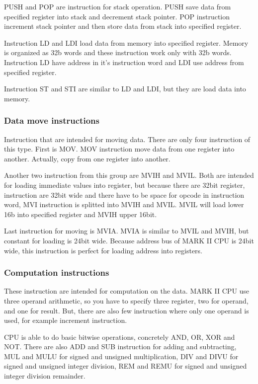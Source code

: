 PUSH and POP are instruction for stack operation. PUSH save data from specified
register into stack and decrement stack pointer. POP instruction increment
stack pointer and then store data from stack into specified register.

Instruction LD and LDI load data from memory into specified register. Memory is
organized as 32b words and these instruction work only with 32b words.
Instruction LD have address in it's instruction word and LDI use address from
specified register.

Instruction ST and STI are similar to LD and LDI, but they are load data into
memory.

\subsubsection{Data move instructions}

Instruction that are intended for moving data. There are only four instruction
of this type. First is MOV. MOV instruction move data from one register into
another. Actually, copy from one register into another.

Another two instruction from this group are MVIH and MVIL. Both are intended
for loading immediate values into register, but because there are 32bit
register, instruction are 32bit wide and there have to be space for opcode in
instruction word, MVI instruction is splitted into MVIH and MVIL. MVIL will
load lower 16b into specified register and MVIH upper 16bit.

Last instruction for moving is MVIA. MVIA is similar to MVIL and MVIH, but
constant for loading is 24bit wide. Because address bus of MARK II CPU is 24bit
wide, this instruction is perfect for loading address into registers.

\subsubsection{Computation instructions}

These instruction are intended for computation on the data. MARK II CPU use
three operand arithmetic, so you have to specify three register, two for
operand, and one for result. But, there are also few instruction where only one
operand is used, for example increment instruction.

CPU is able to do basic bitwise operations, concretely AND, OR, XOR and NOT.
There are also ADD and SUB instruction for adding and subtracting, MUL and MULU
for signed and unsigned multiplication, DIV and DIVU for signed and unsigned
integer division, REM and REMU for signed and unsigned integer division remainder.

